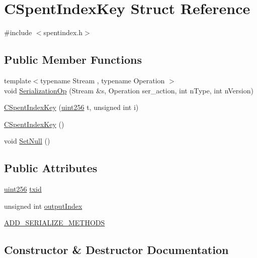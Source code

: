 \hypertarget{struct_c_spent_index_key}{}\section{C\+Spent\+Index\+Key Struct Reference}
\label{struct_c_spent_index_key}


{\ttfamily \#include $<$spentindex.\+h$>$}

\subsection*{Public Member Functions}
\begin{DoxyCompactItemize}
\item 
{\footnotesize template$<$typename Stream , typename Operation $>$ }\\void \mbox{\hyperlink{struct_c_spent_index_key_a1bd965f78b96ed61cf3c51ef36380d82}{Serialization\+Op}} (Stream \&s, Operation ser\+\_\+action, int n\+Type, int n\+Version)
\item 
\mbox{\hyperlink{struct_c_spent_index_key_a15000293a642ba8401427d55e94f3991}{C\+Spent\+Index\+Key}} (\mbox{\hyperlink{classuint256}{uint256}} t, unsigned int i)
\item 
\mbox{\hyperlink{struct_c_spent_index_key_a06486e70f11c6184e27247cc17fc37c1}{C\+Spent\+Index\+Key}} ()
\item 
void \mbox{\hyperlink{struct_c_spent_index_key_aebd848cd3e3e416c96517526fba9a20b}{Set\+Null}} ()
\end{DoxyCompactItemize}
\subsection*{Public Attributes}
\begin{DoxyCompactItemize}
\item 
\mbox{\hyperlink{classuint256}{uint256}} \mbox{\hyperlink{struct_c_spent_index_key_a98f9dd57f9af971b4787ad7ede026f43}{txid}}
\item 
unsigned int \mbox{\hyperlink{struct_c_spent_index_key_a13e6f9f822146526c8112acce999a709}{output\+Index}}
\item 
\mbox{\hyperlink{struct_c_spent_index_key_a4fcfc6a12bc3fdea29994a569c204315}{A\+D\+D\+\_\+\+S\+E\+R\+I\+A\+L\+I\+Z\+E\+\_\+\+M\+E\+T\+H\+O\+DS}}
\end{DoxyCompactItemize}


\subsection{Constructor \& Destructor Documentation}
\mbox{\label{struct_c_spent_index_key_a15000293a642ba8401427d55e94f3991}} 
